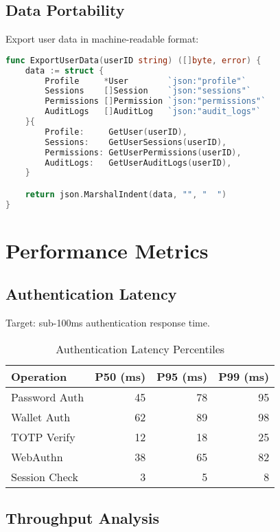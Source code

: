 \documentclass[11pt,a4paper]{article}
\begin{document}
\subsection{Data Portability}

Export user data in machine-readable format:

\begin{lstlisting}[language=Go]
func ExportUserData(userID string) ([]byte, error) {
    data := struct {
        Profile     *User        `json:"profile"`
        Sessions    []Session    `json:"sessions"`
        Permissions []Permission `json:"permissions"`
        AuditLogs   []AuditLog   `json:"audit_logs"`
    }{
        Profile:     GetUser(userID),
        Sessions:    GetUserSessions(userID),
        Permissions: GetUserPermissions(userID),
        AuditLogs:   GetUserAuditLogs(userID),
    }

    return json.MarshalIndent(data, "", "  ")
}
\end{lstlisting}

\section{Performance Metrics}

\subsection{Authentication Latency}

Target: sub-100ms authentication response time.

\begin{table}[h]
\centering
\begin{tabular}{|l|r|r|r|}
\hline
\textbf{Operation} & \textbf{P50 (ms)} & \textbf{P95 (ms)} & \textbf{P99 (ms)} \\
\hline
Password Auth & 45 & 78 & 95 \\
Wallet Auth & 62 & 89 & 98 \\
TOTP Verify & 12 & 18 & 25 \\
WebAuthn & 38 & 65 & 82 \\
Session Check & 3 & 5 & 8 \\
\hline
\end{tabular}
\caption{Authentication Latency Percentiles}
\end{table}

\subsection{Throughput Analysis}
\end{document}
